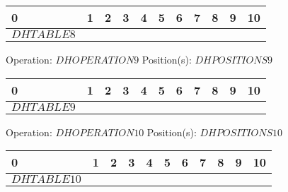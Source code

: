 {{        \begin{center}
            \begin{tabular}{|P{0.75cm}|P{0.75cm}|P{0.75cm}|P{0.75cm}|P{0.75cm}|P{0.75cm}|P{0.75cm}|P{0.75cm}|P{0.75cm}|P{0.75cm}|P{0.75cm}|}
                 & 1 & 2 & 3 & 4 & 5 & 6 & 7 & 8 & 9 & 10  \\
                \hline
                $DHTABLE8$&&&&&&&&&& \\
                \hline
            \end{tabular}
        \end{center}Operation: \underline{$DHOPERATION9$} \hspace{10px} Position(s): \underline{$DHPOSITIONS9$}
        \begin{center}
            \begin{tabular}{|P{0.75cm}|P{0.75cm}|P{0.75cm}|P{0.75cm}|P{0.75cm}|P{0.75cm}|P{0.75cm}|P{0.75cm}|P{0.75cm}|P{0.75cm}|P{0.75cm}|}
                 & 1 & 2 & 3 & 4 & 5 & 6 & 7 & 8 & 9 & 10  \\
                \hline
                $DHTABLE9$&&&&&&&&&& \\
                \hline
            \end{tabular}
        \end{center}Operation: \underline{$DHOPERATION10$} \hspace{10px} Position(s): \underline{$DHPOSITIONS10$}
        \begin{center}
            \begin{tabular}{|P{0.75cm}|P{0.75cm}|P{0.75cm}|P{0.75cm}|P{0.75cm}|P{0.75cm}|P{0.75cm}|P{0.75cm}|P{0.75cm}|P{0.75cm}|P{0.75cm}|}
                 & 1 & 2 & 3 & 4 & 5 & 6 & 7 & 8 & 9 & 10  \\
                \hline
                $DHTABLE10$&&&&&&&&&& \\
                \hline
            \end{tabular}
        \end{center}
    }
}
